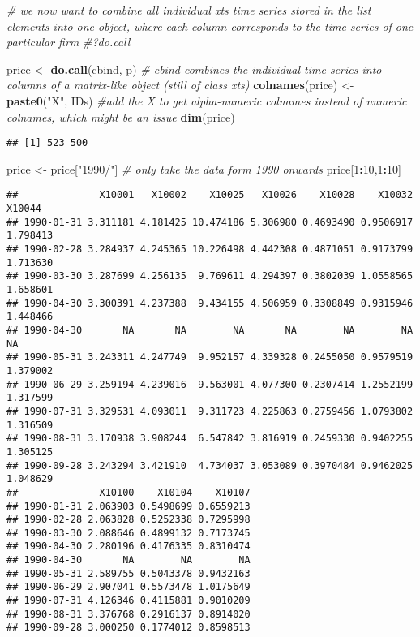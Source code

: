\documentclass[
]{article}
\newenvironment{Shaded}{\begin{snugshade}}{\end{snugshade}}
\newcommand{\CommentTok}[1]{\textcolor[rgb]{0.56,0.35,0.01}{\textit{#1}}}
\newcommand{\DecValTok}[1]{\textcolor[rgb]{0.00,0.00,0.81}{#1}}
\newcommand{\FunctionTok}[1]{\textcolor[rgb]{0.13,0.29,0.53}{\textbf{#1}}}
\newcommand{\NormalTok}[1]{#1}
\newcommand{\OtherTok}[1]{\textcolor[rgb]{0.56,0.35,0.01}{#1}}
\newcommand{\SpecialCharTok}[1]{\textcolor[rgb]{0.81,0.36,0.00}{\textbf{#1}}}
\newcommand{\StringTok}[1]{\textcolor[rgb]{0.31,0.60,0.02}{#1}}
\begin{document}
\begin{Shaded}
\begin{Highlighting}[]
\CommentTok{\# we now want to combine all individual xts time series stored in the list elements into one object, where each column corresponds to the time series of one particular firm}
\CommentTok{\#?do.call}

\NormalTok{price }\OtherTok{\textless{}{-}} \FunctionTok{do.call}\NormalTok{(cbind, p) }\CommentTok{\# cbind combines the individual time series into columns of a matrix{-}like object (still of class xts)}
\FunctionTok{colnames}\NormalTok{(price) }\OtherTok{\textless{}{-}} \FunctionTok{paste0}\NormalTok{(}\StringTok{"X"}\NormalTok{, IDs) }\CommentTok{\#add the X to get alpha{-}numeric colnames instead of numeric colnames, which might be an issue}
\FunctionTok{dim}\NormalTok{(price)}
\end{Highlighting}
\end{Shaded}

\begin{verbatim}
## [1] 523 500
\end{verbatim}

\begin{Shaded}
\begin{Highlighting}[]
\NormalTok{price }\OtherTok{\textless{}{-}}\NormalTok{ price[}\StringTok{"1990/"}\NormalTok{] }\CommentTok{\# only take the data form 1990 onwards}
\NormalTok{price[}\DecValTok{1}\SpecialCharTok{:}\DecValTok{10}\NormalTok{,}\DecValTok{1}\SpecialCharTok{:}\DecValTok{10}\NormalTok{]}
\end{Highlighting}
\end{Shaded}

\begin{verbatim}
##              X10001   X10002    X10025   X10026    X10028    X10032   X10044
## 1990-01-31 3.311181 4.181425 10.474186 5.306980 0.4693490 0.9506917 1.798413
## 1990-02-28 3.284937 4.245365 10.226498 4.442308 0.4871051 0.9173799 1.713630
## 1990-03-30 3.287699 4.256135  9.769611 4.294397 0.3802039 1.0558565 1.658601
## 1990-04-30 3.300391 4.237388  9.434155 4.506959 0.3308849 0.9315946 1.448466
## 1990-04-30       NA       NA        NA       NA        NA        NA       NA
## 1990-05-31 3.243311 4.247749  9.952157 4.339328 0.2455050 0.9579519 1.379002
## 1990-06-29 3.259194 4.239016  9.563001 4.077300 0.2307414 1.2552199 1.317599
## 1990-07-31 3.329531 4.093011  9.311723 4.225863 0.2759456 1.0793802 1.316509
## 1990-08-31 3.170938 3.908244  6.547842 3.816919 0.2459330 0.9402255 1.305125
## 1990-09-28 3.243294 3.421910  4.734037 3.053089 0.3970484 0.9462025 1.048629
##              X10100    X10104    X10107
## 1990-01-31 2.063903 0.5498699 0.6559213
## 1990-02-28 2.063828 0.5252338 0.7295998
## 1990-03-30 2.088646 0.4899132 0.7173745
## 1990-04-30 2.280196 0.4176335 0.8310474
## 1990-04-30       NA        NA        NA
## 1990-05-31 2.589755 0.5043378 0.9432163
## 1990-06-29 2.907041 0.5573478 1.0175649
## 1990-07-31 4.126346 0.4115881 0.9010209
## 1990-08-31 3.376768 0.2916137 0.8914020
## 1990-09-28 3.000250 0.1774012 0.8598513
\end{verbatim}
\end{document}
